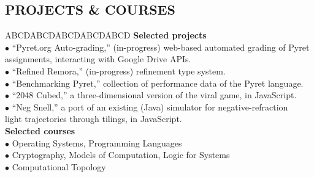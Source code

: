 \documentclass{res}
\newcommand{\myvspace}{\vspace{-0.09in}} %
\newcommand{\sectionVspace}{\vspace{-0.40in}}
\begin{document}
\begin{resume}
\section{PROJECTS \& COURSES} %
    \myvspace
    \begin{tabbing}
        ABCD\=ABCD\=ABCD\=ABCD\=ABCD\kill
        {\bf Selected projects}\\
            \>$\bullet$ ``Pyret.org Auto-grading,'' (in-progress) web-based automated grading of Pyret\\
                \>\phantom{$\bullet$} assignments, interacting with Google Drive APIs.\\
            \>$\bullet$ ``Refined Remora,'' (in-progress) refinement type system.\\
            \>$\bullet$ ``Benchmarking Pyret,'' collection of performance data of the Pyret language.\\
            \>$\bullet$ ``2048 Cubed,'' a three-dimensional version of the viral game, in JavaScript.\\
            \>$\bullet$ ``Neg Snell,'' a port of an existing (Java) simulator for negative-refraction\\
                \>\phantom{$\bullet$} light trajectories through tilings, in JavaScript.\\
        {\bf Selected courses}\\
            \>$\bullet$ Operating Systems, Programming Languages\\
            \>$\bullet$ Cryptography, Models of Computation, Logic for Systems\\
            \>$\bullet$ Computational Topology
    \end{tabbing}

\end{resume}
\end{document}
